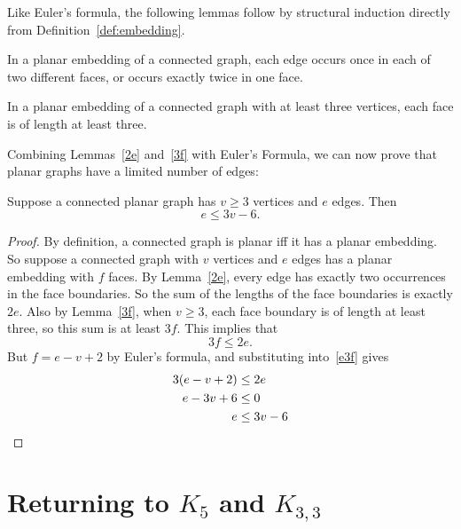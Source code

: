 Like Euler's formula, the following lemmas follow by structural induction
directly from Definition~\ref{def:embedding}.

\begin{lemma}\label{2e}
In a planar embedding of a connected graph, each edge occurs once in
each of two different faces, or occurs exactly twice in one face.
\end{lemma}

\begin{lemma}\label{3f}
  In a planar embedding of a connected graph with at least three vertices,
  each face is of length at least three.
\end{lemma}

Combining Lemmas~\ref{2e} and~\ref{3f} with Euler's Formula, we can
now prove that planar graphs have a limited number of edges:

\begin{theorem}\label{th:e3v}
  Suppose a connected planar graph has $v \geq 3$ vertices and $e$
  edges.  Then
\begin{equation}\label{eq:e3v}
    e \leq 3v-6.
\end{equation}
\end{theorem}

\begin{proof}
By definition, a connected graph is planar iff it has a planar
embedding.  So suppose a connected graph with $v$ vertices and $e$
edges has a planar embedding with $f$ faces.  By Lemma~\ref{2e}, every
edge has exactly two occurrences in the face boundaries.  So the sum
of the lengths of the face boundaries is exactly $2e$.  Also by
Lemma~\ref{3f}, when $v \geq 3$, each face boundary is of length at
least three, so this sum is at least $3f$.  This implies that
\begin{equation}\label{e3f}
3f \leq 2e.
\end{equation}
But $f = e-v+2$ by Euler's formula, and substituting into~\eqref{e3f} gives
\begin{align*}
3(e-v+2) & \leq 2e\\
e-3v + 6  & \leq 0\\
e & \leq 3v - 6 \qedhere
\end{align*}
\end{proof}

\section{Returning to $K_5$ and $K_{3,3}$}

